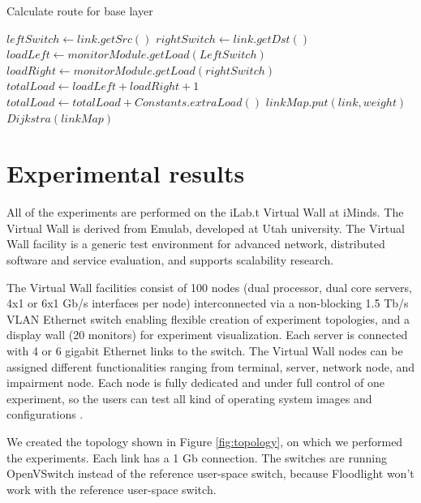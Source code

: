 \documentclass[conference]{IEEEtran}
\begin{document}
\begin{algorithm}
\caption{Calculate route for base layer}
\label{alg2}
\begin{algorithmic}
\STATE $leftSwitch \leftarrow link.getSrc()$
\STATE $rightSwitch \leftarrow link.getDst()$
\STATE $loadLeft \leftarrow monitorModule.getLoad(LeftSwitch)$
\STATE $loadRight \leftarrow monitorModule.getLoad(rightSwitch)$
\STATE $totalLoad \leftarrow loadLeft + loadRight + 1$
\STATE $totalLoad \leftarrow totalLoad + Constants.extraLoad()$
\ENDIF
\STATE $linkMap.put(link,weight)$
\ENDFOR
$Dijkstra(linkMap)$
\end{algorithmic}
\end{algorithm}

\section{Experimental results}

All of the experiments are performed on the iLab.t Virtual Wall at iMinds.
The Virtual Wall is derived from Emulab, developed at Utah university.
The Virtual Wall facility is a generic test environment for advanced network, 
distributed software and service evaluation, and supports scalability research.

The Virtual Wall facilities consist of 100 nodes 
(dual processor, dual core servers, 4x1 or 6x1 Gb/s interfaces per node)
interconnected via a non-blocking 1.5 Tb/s VLAN Ethernet switch enabling flexible creation of experiment topologies, 
and a display wall (20 monitors) for experiment visualization. 
Each server is connected with 4 or 6 gigabit Ethernet links to the switch. 
The Virtual Wall nodes can be assigned different functionalities ranging 
from terminal, server, network node, and impairment node. 
Each node is fully dedicated and under full control of one experiment, 
so the users can test all kind of operating system images and configurations \cite{virtual}.

We created the topology shown in Figure \ref{fig:topology}, on which we performed the experiments.
Each link has a 1 Gb connection. The switches are running OpenVSwitch instead of the reference user-space switch, 
because Floodlight won't work with the reference user-space switch.
\end{document}
